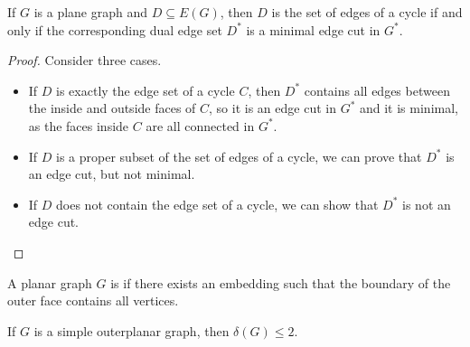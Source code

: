
\begin{theorem}
  If $G$ is a plane graph and $D \subseteq E(G)$, then $D$ is the set of edges
  of a cycle if and only if the corresponding dual edge set $D^*$ is a minimal
  edge cut in $G^*$.
\end{theorem}

\begin{proof}
  Consider three cases.
  \begin{itemize}
  \item If $D$ is exactly the edge set of a cycle $C$, then $D^*$ contains all
	edges between the inside and outside faces of $C$, so it is an edge cut in
	$G^*$ and it is minimal, as the faces inside $C$ are all connected in $G^*$.
  \item If $D$ is a proper subset of the set of edges of a cycle, we can prove
	that $D^*$ is an edge cut, but not minimal.
  \item If $D$ does not contain the edge set of a cycle, we can show that $D^*$
	is not an edge cut. \qedhere
  \end{itemize}
\end{proof}

\begin{definition}
  A planar graph $G$ is  if there exists an embedding such
  that the boundary of the outer face contains all vertices.
\end{definition}

\begin{theorem}
  If $G$ is a simple outerplanar graph, then $\delta(G) \le 2$.
\end{theorem}

